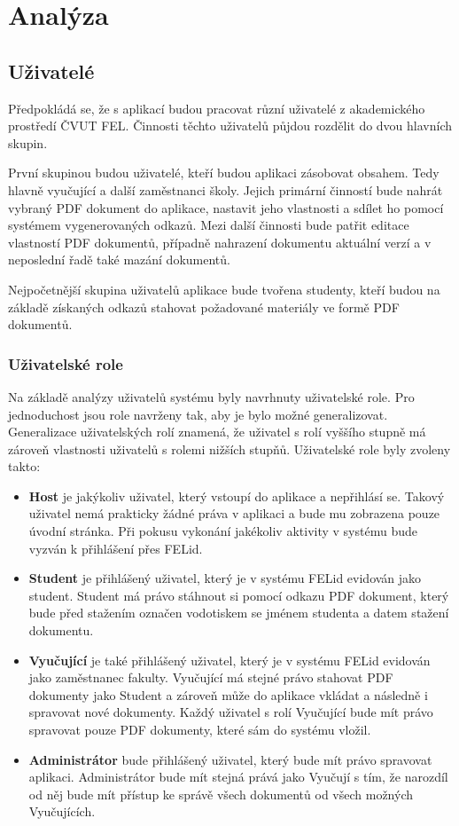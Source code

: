 \chapter{Analýza}

\section{Uživatelé}
Předpokládá se, že s aplikací budou pracovat různí uživatelé z akademického prostředí ČVUT FEL. Činnosti těchto uživatelů půjdou rozdělit do dvou hlavních skupin. 

První skupinou budou uživatelé, kteří budou aplikaci zásobovat obsahem. Tedy hlavně vyučující a další zaměstnanci školy. Jejich primární činností bude nahrát vybraný PDF dokument do aplikace, nastavit jeho vlastnosti a sdílet ho pomocí systémem vygenerovaných odkazů. Mezi další činnosti bude patřit editace vlastností PDF dokumentů, případně nahrazení dokumentu aktuální verzí a v neposlední řadě také mazání dokumentů.

Nejpočetnější skupina uživatelů aplikace bude tvořena studenty, kteří budou na základě získaných odkazů stahovat požadované materiály ve formě PDF dokumentů. 

\subsection{Uživatelské role}
Na základě analýzy uživatelů systému byly navrhnuty uživatelské role. Pro jednoduchost jsou role navrženy tak, aby je bylo možné generalizovat. Generalizace uživatelských rolí znamená, že uživatel s rolí vyššího stupně má zároveň vlastnosti uživatelů s rolemi nižších stupňů. Uživatelské role byly zvoleny takto:

\begin{itemize}
    \item \textbf{Host} je jakýkoliv uživatel, který vstoupí do aplikace a nepřihlásí se. Takový uživatel nemá prakticky žádné práva v aplikaci a bude mu zobrazena pouze úvodní stránka. Při pokusu vykonání jakékoliv aktivity v systému bude vyzván k přihlášení přes FELid.
    \item \textbf{Student} je přihlášený uživatel, který je v systému FELid evidován jako student. Student má právo stáhnout si pomocí odkazu PDF dokument, který bude před stažením označen vodotiskem se jménem studenta a datem stažení dokumentu.  
    \item \textbf{Vyučující} je také přihlášený uživatel, který je v systému FELid evidován jako zaměstnanec fakulty. Vyučující má stejné právo stahovat PDF dokumenty jako Student a zároveň může do aplikace vkládat a následně i spravovat nové dokumenty. Každý uživatel s rolí Vyučující bude mít právo spravovat pouze PDF dokumenty, které sám do systému vložil.
    \item \textbf{Administrátor} bude přihlášený uživatel, který bude mít právo spravovat aplikaci. Administrátor bude mít stejná prává jako Vyučují s tím, že narozdíl od něj bude mít přístup ke správě všech dokumentů od všech možných Vyučujících.
\end{itemize}

